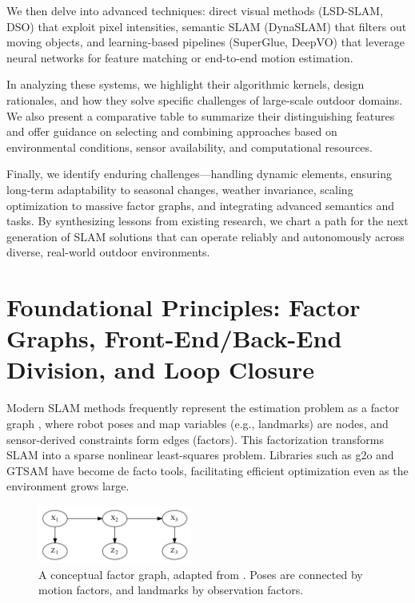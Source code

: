 \documentclass[conference]{IEEEtran}
\begin{document}
We then delve into advanced techniques: direct visual methods (LSD-SLAM, DSO) that exploit pixel intensities, semantic SLAM (DynaSLAM) that filters out moving objects, and learning-based pipelines (SuperGlue, DeepVO) that leverage neural networks for feature matching or end-to-end motion estimation.

In analyzing these systems, we highlight their algorithmic kernels, design rationales, and how they solve specific challenges of large-scale outdoor domains. We also present a comparative table to summarize their distinguishing features and offer guidance on selecting and combining approaches based on environmental conditions, sensor availability, and computational resources.

Finally, we identify enduring challenges—handling dynamic elements, ensuring long-term adaptability to seasonal changes, weather invariance, scaling optimization to massive factor graphs, and integrating advanced semantics and tasks. By synthesizing lessons from existing research, we chart a path for the next generation of SLAM solutions that can operate reliably and autonomously across diverse, real-world outdoor environments.

\section{Foundational Principles: Factor Graphs, Front-End/Back-End Division, and Loop Closure}
Modern SLAM methods frequently represent the estimation problem as a factor graph \cite{10,12}, where robot poses and map variables (e.g., landmarks) are nodes, and sensor-derived constraints form edges (factors). This factorization transforms SLAM into a sparse nonlinear least-squares problem. Libraries such as g2o \cite{13} and GTSAM \cite{10} have become de facto tools, facilitating efficient optimization even as the environment grows large.

\begin{figure}[htbp]
\centerline{\includegraphics[width=0.45\textwidth]{factor_graph.png}}
\caption{A conceptual factor graph, adapted from \cite{10}. Poses are connected by motion factors, and landmarks by observation factors.}
\label{fig:factor_graph}
\end{figure}
\end{document}
